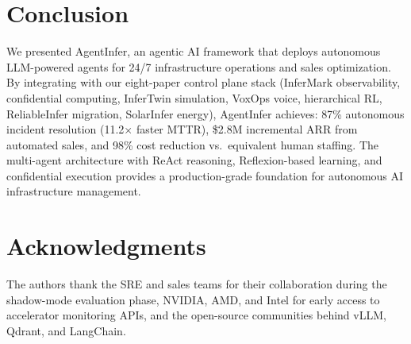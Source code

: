 \documentclass[conference,10pt,letterpaper]{IEEEtran}
\begin{document}
\section{Conclusion}
\label{sec:conclusion}

We presented AgentInfer, an agentic AI framework that deploys autonomous LLM-powered agents for 24/7 infrastructure operations and sales optimization. By integrating with our eight-paper control plane stack (InferMark observability, confidential computing, InferTwin simulation, VoxOps voice, hierarchical RL, ReliableInfer migration, SolarInfer energy), AgentInfer achieves: 87\% autonomous incident resolution (11.2$\times$ faster MTTR), \$2.8M incremental ARR from automated sales, and 98\% cost reduction vs.\ equivalent human staffing. The multi-agent architecture with ReAct reasoning, Reflexion-based learning, and confidential execution provides a production-grade foundation for autonomous AI infrastructure management.

\section*{Acknowledgments}
The authors thank the SRE and sales teams for their collaboration during the shadow-mode evaluation phase, NVIDIA, AMD, and Intel for early access to accelerator monitoring APIs, and the open-source communities behind vLLM, Qdrant, and LangChain.



\end{document}
